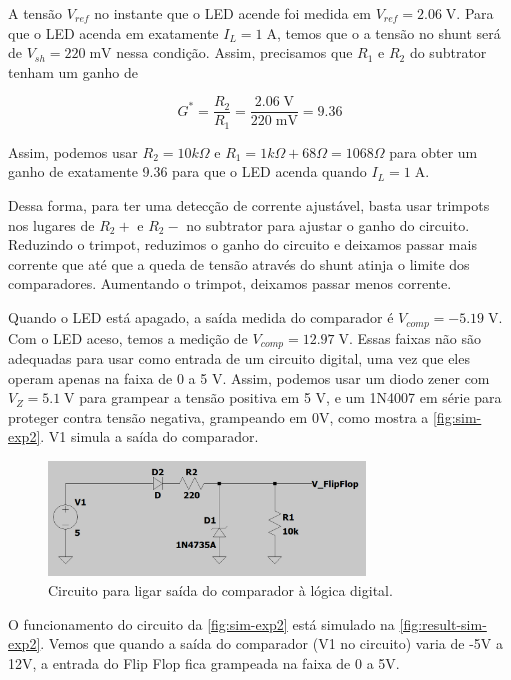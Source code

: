 \documentclass[
	12pt,				%
	oneside,			%
	a4paper,			%
	chapter=TITLE,
	sumario=tradicional,
	english,			%
	brazil				%
]{abntex2}
\newcommand{\un}[1]{\;\text{#1}}
\begin{document}
A tensão $V_{ref}$ no instante que o LED acende foi medida em $V_{ref} = 2.06 \un{V}$.
Para que o LED acenda em exatamente $I_L = 1 \un{A}$, temos que o a tensão no shunt será de 
$V_{sh} = 220 \un{mV}$ nessa condição. Assim, precisamos que $R_1$ e $R_2$ do subtrator 
tenham um ganho de 

\[ G^* = \frac{R_2}{R_1} = \frac{2.06 \un{V}}{ 220 \un{mV}} = 9.36 \]

Assim, podemos usar $R_2 = 10 k\Omega$ e $R_1 = 1 k\Omega + 68 \Omega = 1068 \Omega$
para obter um ganho de exatamente 9.36 para que o LED acenda quando $I_L = 1 \un{A}$.

Dessa forma, para ter uma detecção de corrente ajustável, basta usar trimpots nos lugares 
de $R_2+$ e $R_2-$ no subtrator para ajustar o ganho do circuito. Reduzindo o trimpot, 
reduzimos o ganho do circuito e deixamos passar mais corrente que até que a queda de tensão 
através do shunt atinja o limite dos comparadores. Aumentando o trimpot, deixamos 
passar menos corrente.

Quando o LED está apagado, a saída medida do comparador é $V_{comp} = - 5.19 \un{V}$.
Com o LED aceso, temos a medição de $V_{comp} = 12.97 \un{V}$.
Essas faixas não são adequadas para usar como entrada de um circuito digital, uma vez que eles 
operam apenas na faixa de 0 a 5 V. Assim, podemos usar um diodo zener com $V_Z = 5.1 \un{V}$
para grampear a tensão positiva em 5 V, e um 1N4007 em série para proteger contra tensão negativa,
grampeando em 0V, como mostra a \autoref{fig:sim-exp2}. V1 simula a saída do comparador.

\begin{figure}[h!]
	\caption{\label{fig:sim-exp2}Circuito para ligar saída do comparador à lógica digital.}
	\begin{center}
    \includegraphics[width=0.75\textwidth,trim=1 1 1 1,clip]{images/sim-exp2.png}
	\end{center}
\end{figure}

O funcionamento do circuito da \autoref{fig:sim-exp2} está simulado na 
\autoref{fig:result-sim-exp2}. Vemos que quando a saída do comparador (V1 no circuito) 
varia de -5V a 12V, a entrada do Flip Flop fica grampeada na faixa de 0 a 5V.
\end{document}
